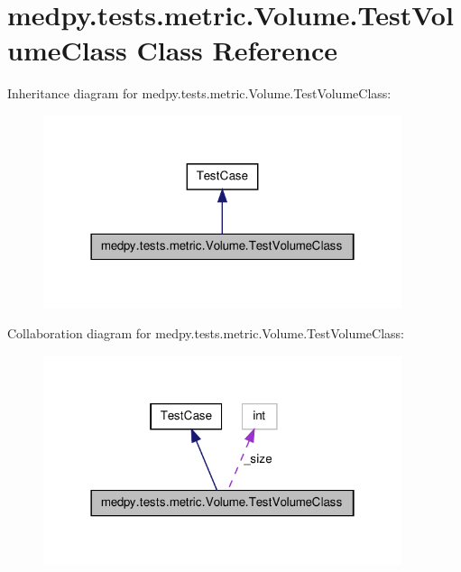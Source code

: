 \hypertarget{classmedpy_1_1tests_1_1metric_1_1Volume_1_1TestVolumeClass}{
\section{medpy.tests.metric.Volume.TestVolumeClass Class Reference}
\label{classmedpy_1_1tests_1_1metric_1_1Volume_1_1TestVolumeClass}
}


Inheritance diagram for medpy.tests.metric.Volume.TestVolumeClass:\nopagebreak
\begin{figure}[H]
\begin{center}
\leavevmode
\includegraphics[width=298pt]{classmedpy_1_1tests_1_1metric_1_1Volume_1_1TestVolumeClass__inherit__graph}
\end{center}
\end{figure}


Collaboration diagram for medpy.tests.metric.Volume.TestVolumeClass:\nopagebreak
\begin{figure}[H]
\begin{center}
\leavevmode
\includegraphics[width=298pt]{classmedpy_1_1tests_1_1metric_1_1Volume_1_1TestVolumeClass__coll__graph}
\end{center}
\end{figure}
